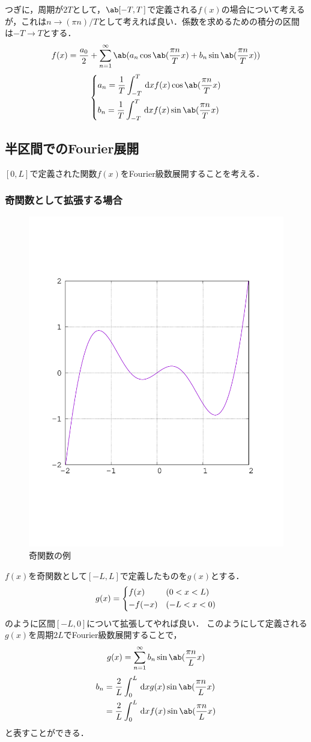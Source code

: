 つぎに，周期が$2T$として，$\ab[-T, T\,]$で定義される$f(x)$の場合について考えるが，これは$n \to (\pi n)/T$として考えれば良い．係数を求めるための積分の区間は$-T\to T$とする．
\begin{gather}  
  f(x) = \frac{a_0}{2} + \sum_{n=1}^\infty \ab(a_n\cos\ab(\frac{\pi n}{T}x) + b_n \sin\ab(\frac{\pi n}{T}x))
\end{gather}
\begin{gather}
  \begin{dcases}
    a_n = \frac{1}{T} \int_{-T}^T \dl{x} f(x) \cos\ab(\frac{\pi n}{T}x)\\
    b_n = \frac{1}{T} \int_{-T}^T \dl{x} f(x) \sin\ab(\frac{\pi n}{T}x)
  \end{dcases}
\end{gather}

\subsection{半区間でのFourier展開}
$[0, L]$で定義された関数$f(x)$をFourier級数展開することを考える．
\subsubsection{奇関数として拡張する場合}
\begin{figure}[H]
  \centering
  \includegraphics[width=0.4\linewidth]{fig/odd_func.pdf}  
  \caption{奇関数の例}
\end{figure}
$f(x)$を奇関数として$[-L, L]$で定義したものを$g(x)$とする．
\begin{gather}  
  g(x) = 
  \begin{dcases}
    f(x) & (0 < x < L)\\
    -f(-x) & (-L<x<0)
  \end{dcases}
\end{gather}
のように区間$[-L, 0]$について拡張してやれば良い．
このようにして定義される$g(x)$を周期$2L$でFourier級数展開することで，
\begin{gather}
  g(x) = \sum_{n=1}^\infty b_n \sin\ab(\frac{\pi n}{L}x)
\end{gather}
\begin{align}  
  b_n &= \frac{2}{L} \int_0^L \dl{x} g(x)\sin\ab(\frac{\pi n}{L}x)\\
      &= \frac{2}{L}\int_0^L \dl{x}f(x) \sin\ab(\frac{\pi n}{L} x)
\end{align}
と表すことができる．

